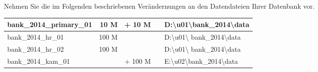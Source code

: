\item Nehmen Sie die im Folgenden beschriebenen Verändernungen an den
Datendateien Ihrer Datenbank  vor.
\begin{center}
  \begin{small}
    \tablehead{
    }
    \tabletail {
    }
    \tablelasttail {
    }
    \begin{supertabular}{lrrrl}
        bank\_2014\_primary\_01 &  10 M &  + 10 M & \color{red}{768 M} &
        D:\textbackslash u01\textbackslash bank\_2014\textbackslash data \\
        \hline
        bank\_2014\_hr\_01     & 100 M & \color{red}{+ 50 M}&
        \color{red}{1 G} & D:\textbackslash u01\textbackslash
        bank\_2014\textbackslash data \\
        bank\_2014\_hr\_02     & 100 M & \color{red}{+ 50 M}&
        \color{red}{1 G} & D:\textbackslash u01\textbackslash
        bank\_2014\textbackslash data \\
        \hline
        bank\_2014\_kam\_01    & \color{red}{500 M} & + 100 M & \color{red}{2 G} &
        E:\textbackslash u02\textbackslash bank\_2014\textbackslash data \\
    \end{supertabular}
  \end{small}
\end{center}
